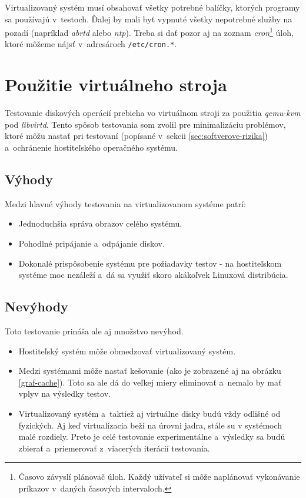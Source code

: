 Virtualizovaný systém musí obsahovať všetky potrebné balíčky, ktorých programy
sa používajú v~testoch. Ďalej by mali byť vypnuté všetky nepotrebné služby na
pozadí (napríklad \emph{abrtd} alebo \emph{ntp}). Treba si dať pozor aj na
zoznam \emph{cron}\footnote{Časovo závyslí plánovač úloh. Každý užívateľ si
môže naplánovať vykonávanie príkazov v~daných časových intervaloch.} úloh,
ktoré môžeme nájsť v~adresároch \texttt{/etc/cron.*}.

%
%

\section{Použitie virtuálneho stroja}
\label{sec:virtual-machine}

Testovanie diskových operácií prebieha vo virtuálnom stroji za použitia
\emph{qemu-kvm} pod \emph{libvirtd}. Tento spôsob testovania som zvolil pre
minimalizáciu problémov, ktoré môžu nastať pri testovaní (popísané v~sekcii
\ref{sec:softverove-rizika}) a~ochránenie hostiteľského operačného systému.

\subsection{Výhody}

Medzi hlavné výhody testovania na virtualizovanom systéme patrí:

\begin{itemize}
    \item Jednoduchšia správa obrazov celého systému.
    \item Pohodlné pripájanie a~odpájanie diskov.
    \item Dokonalé prispôsobenie systému pre požiadavky testov - na
    hostiteľskom systéme moc nezáleží a~dá sa využiť skoro akákoľvek Linuxová
    distribúcia.
\end{itemize}

\subsection{Nevýhody}

Toto testovanie prináša ale aj množstvo nevýhod. 

\begin{itemize}
    \item Hostiteľský systém môže obmedzovať virtualizovaný systém.
    \item Medzi systémami môže nastať kešovanie (ako je zobrazené aj na obrázku
    \ref{graf-cache}). Toto sa ale dá do veľkej miery eliminovať a~nemalo by
    mať vplyv na výsledky testov.
    \item Virtualizovaný systém a~taktiež aj virtuálne disky budú vždy odlišné
    od fyzických. Aj keď virtualízacia beží na úrovni jadra, stále su v
    systémoch malé rozdiely. Preto je celé testovanie experimentálne a~výsledky
    sa budú zbierať a~priemerovať z~viacerých iterácií testovania.
\end{itemize}

